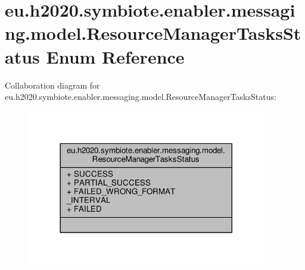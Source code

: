 \hypertarget{enumeu_1_1h2020_1_1symbiote_1_1enabler_1_1messaging_1_1model_1_1ResourceManagerTasksStatus}{}\section{eu.\+h2020.\+symbiote.\+enabler.\+messaging.\+model.\+Resource\+Manager\+Tasks\+Status Enum Reference}
\label{enumeu_1_1h2020_1_1symbiote_1_1enabler_1_1messaging_1_1model_1_1ResourceManagerTasksStatus}


Collaboration diagram for eu.\+h2020.\+symbiote.\+enabler.\+messaging.\+model.\+Resource\+Manager\+Tasks\+Status\+:
\nopagebreak
\begin{figure}[H]
\begin{center}
\leavevmode
\includegraphics[width=296pt]{enumeu_1_1h2020_1_1symbiote_1_1enabler_1_1messaging_1_1model_1_1ResourceManagerTasksStatus__coll__graph}
\end{center}
\end{figure}
